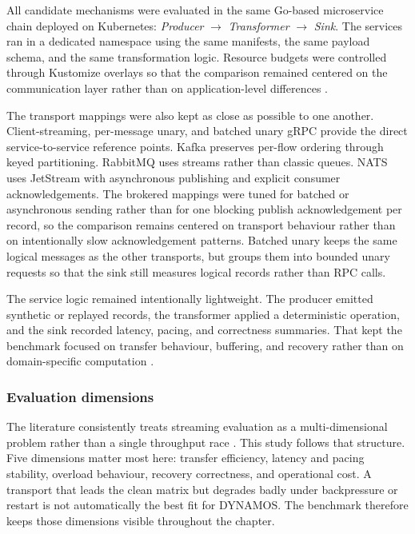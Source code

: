 All candidate mechanisms were evaluated in the same Go-based microservice chain deployed on Kubernetes: \emph{Producer} $\rightarrow$ \emph{Transformer} $\rightarrow$ \emph{Sink}. The services ran in a dedicated namespace using the same manifests, the same payload schema, and the same transformation logic. Resource budgets were controlled through Kustomize overlays so that the comparison remained centered on the communication layer rather than on application-level differences \cite{karimov2018benchmarking,Henning2021ScalabilityMetrics}.

The transport mappings were also kept as close as possible to one another. Client-streaming, per-message unary, and batched unary gRPC provide the direct service-to-service reference points. Kafka preserves per-flow ordering through keyed partitioning. RabbitMQ uses streams rather than classic queues. NATS uses JetStream with asynchronous publishing and explicit consumer acknowledgements. The brokered mappings were tuned for batched or asynchronous sending rather than for one blocking publish acknowledgement per record, so the comparison remains centered on transport behaviour rather than on intentionally slow acknowledgement patterns. Batched unary keeps the same logical messages as the other transports, but groups them into bounded unary requests so that the sink still measures logical records rather than RPC calls.

The service logic remained intentionally lightweight. The producer emitted synthetic or replayed records, the transformer applied a deterministic operation, and the sink recorded latency, pacing, and correctness summaries. That kept the benchmark focused on transfer behaviour, buffering, and recovery rather than on domain-specific computation \cite{coviello2022dataxc,systematicstreaming}.

\subsubsection{Evaluation dimensions}

The literature consistently treats streaming evaluation as a multi-dimensional problem rather than a single throughput race \cite{coviello2022dataxc,systematicstreaming,ciftci2025ipcmechanisms}. This study follows that structure. Five dimensions matter most here: transfer efficiency, latency and pacing stability, overload behaviour, recovery correctness, and operational cost. A transport that leads the clean matrix but degrades badly under backpressure or restart is not automatically the best fit for DYNAMOS. The benchmark therefore keeps those dimensions visible throughout the chapter.

